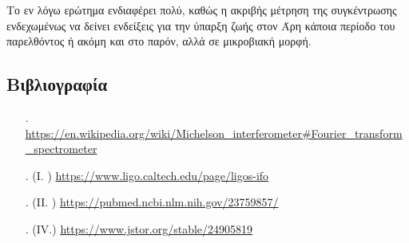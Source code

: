 \documentclass[a4paper]{article}
\begin{document}
Το εν λόγω ερώτημα ενδιαφέρει πολύ, καθώς η ακριβής μέτρηση της συγκέντρωσης ενδεχωμένως να δείνει ενδείξεις για την ύπαρξη ζωής στον Άρη κάποια περίοδο του παρελθόντος ή ακόμη και στο παρόν, αλλά σε μικροβιακή μορφή.


\subsection*{Βιβλιογραφία}
\begin{itemize}
\item[.] \url{https://en.wikipedia.org/wiki/Michelson_interferometer#Fourier_transform_spectrometer}
\item[.] (I.  ) \url{https://www.ligo.caltech.edu/page/ligos-ifo}
\item[.] (II. ) \url{https://pubmed.ncbi.nlm.nih.gov/23759857/}
\item[.] (IV.) \url{https://www.jstor.org/stable/24905819}


\end{itemize}
\end{document}
